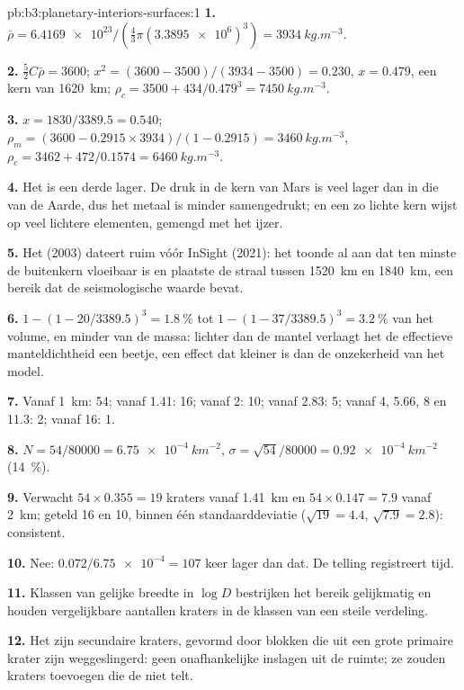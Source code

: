 \begin{solution}{pb:b3:planetary-interiors-surfaces:1}
\textbf{1.} $\bar\rho = \num{6.4169e23}/(\tfrac43\pi(\num{3.3895e6})^3) =
\qty{3934}{kg.m^{-3}}$.

\textbf{2.} $\tfrac52C\bar\rho = 3600$; $x^2 = (3600 - 3500)/(3934 - 3500) =
0.230$, $x = 0.479$, een kern van \qty{1620}{km}; $\rho_c = 3500 +
434/0.479^3 = \qty{7450}{kg.m^{-3}}$.

\textbf{3.} $x = 1830/3389.5 = 0.540$; $\rho_m = (3600 - 0.2915\times
3934)/(1 - 0.2915) = \qty{3460}{kg.m^{-3}}$, $\rho_c = 3462 +
472/0.1574 = \qty{6460}{kg.m^{-3}}$.

\textbf{4.} Het is een derde lager. De druk in de kern van Mars is veel
lager dan in die van de Aarde, dus het metaal is minder samengedrukt; en
een zo lichte kern wijst op veel lichtere elementen, gemengd met het ijzer.

\textbf{5.} Het  (2003) dateert ruim vóór InSight (2021): het
toonde al aan dat ten minste de buitenkern vloeibaar is en plaatste de
straal tussen \qty{1520}{km} en \qty{1840}{km}, een bereik dat de
seismologische waarde bevat.

\textbf{6.} $1 - (1 - 20/3389.5)^3 = \qty{1.8}{\percent}$ tot $1 - (1 -
37/3389.5)^3 = \qty{3.2}{\percent}$ van het volume, en minder van de massa:
lichter dan de mantel verlaagt het de effectieve manteldichtheid een beetje,
een effect dat kleiner is dan de onzekerheid van het model.

\textbf{7.} Vanaf \qty{1}{km}: 54; vanaf 1.41: 16; vanaf 2: 10; vanaf 2.83: 5;
vanaf 4, 5.66, 8 en 11.3: 2; vanaf 16: 1.

\textbf{8.} $N = 54/80000 = \qty{6.75e-4}{km^{-2}}$, $\sigma = \sqrt{54}/80000
= \qty{0.92e-4}{km^{-2}}$ (\qty{14}{\percent}).

\textbf{9.} Verwacht $54\times0.355 = 19$ kraters vanaf \qty{1.41}{km} en
$54\times0.147 = 7.9$ vanaf \qty{2}{km}; geteld 16 en 10, binnen één
standaarddeviatie ($\sqrt{19} = 4.4$, $\sqrt{7.9} = 2.8$): consistent.

\textbf{10.} Nee: $0.072/\num{6.75e-4} = 107$ keer lager dan dat. De telling
registreert tijd.

\textbf{11.} Klassen van gelijke breedte in $\log D$ bestrijken het bereik
gelijkmatig en houden vergelijkbare aantallen kraters in de klassen van een steile verdeling.

\textbf{12.} Het zijn secundaire kraters, gevormd door blokken die uit een
grote primaire krater zijn weggeslingerd: geen onafhankelijke inslagen uit de ruimte; ze zouden
kraters toevoegen die de  niet telt.


\end{solution}
